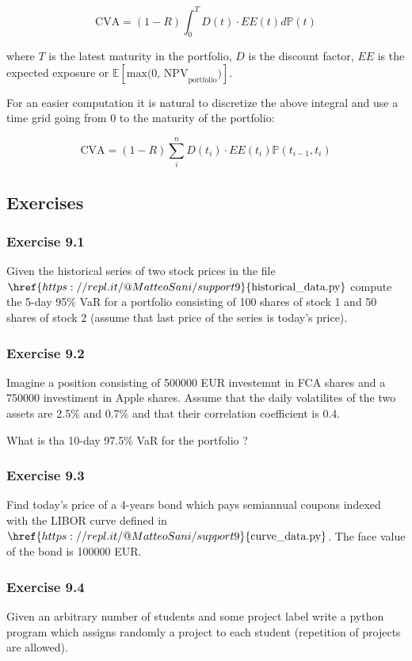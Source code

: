 \[ \text{CVA} = (1-R) \int_0^T D(t) \cdot EE(t) d\mathbb{P}(t) \]

where \(T\) is the latest maturity in the portfolio, \(D\) is the
discount factor, \(EE\) is the expected exposure or
\(\mathbb{E}[\text{max(0, NPV}_\text{portfolio})]\).

For an easier computation it is natural to discretize the above integral
and use a time grid going from 0 to the maturity of the portfolio:

\[ \text{CVA} = (1-R) \sum_i^n D(t_i) \cdot EE(t_i) \mathbb{P}(t_{i-1}, t_i) \]

\subsection{Exercises}\label{exercises}

\hypertarget{exercise-9.1}{%
\subsubsection{Exercise 9.1}\label{exercise-9.1}}

Given the historical series of two stock prices in the file
\(\href{https://repl.it/@MatteoSani/support9}{\textrm{historical\_data.py}}\)
compute the 5-day 95\% VaR for a portfolio consisting of 100 shares of
stock 1 and 50 shares of stock 2 (assume that last price of the series
is today's price).

\hypertarget{exercise-9.2}{%
\subsubsection{Exercise 9.2}\label{exercise-9.2}}

Imagine a position consisting of 500000 EUR investemnt in FCA shares and
a 750000 investiment in Apple shares. Assume that the daily volatilites
of the two assets are 2.5\% and 0.7\% and that their correlation
coefficient is 0.4.

What is tha 10-day 97.5\% VaR for the portfolio ?

\hypertarget{exercise-9.3}{%
\subsubsection{Exercise 9.3}\label{exercise-9.3}}
Find today's price of a 4-years bond which pays semiannual coupons indexed with the LIBOR curve defined in \(\href{https://repl.it/@MatteoSani/support9}{\textrm{curve\_data.py}}\). The face value of the bond is 100000 EUR.

\hypertarget{exercise-9.4}{%
\subsubsection{Exercise 9.4}\label{exercise-9.4}}

Given an arbitrary number of students and some project label
write a python program which assigns randomly a project to each student
(repetition of projects are allowed).
